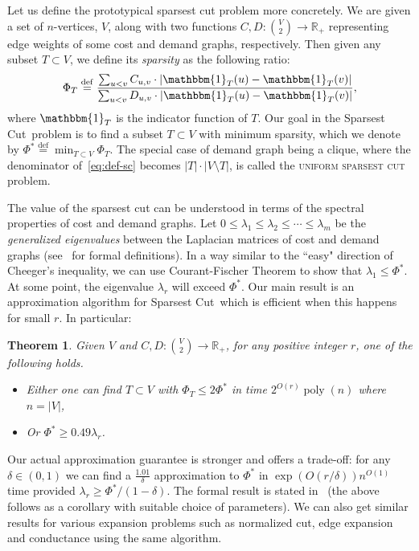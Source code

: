 \documentclass{article}
\def\triangleq{\overset{\mathrm{def}}{=}}
\newtheorem{theorem}{Theorem}[section]
\DeclareMathOperator{\poly}{poly}
\newcommand{\R}{\mathbb{R}}
\newcommand{\ind}[1]{\mathbbm{1}_{#1}}
\newcommand{\nusc}{\textsc{\sf Non-Uniform Sparsest Cut}}
\newcounter{alg-count}
\def\ngap{}
\renewcommand{\nusc}{{\sc Sparsest Cut}}
\newcommand{\vnote}[1]{}
\newcommand{\aknote}[1]{}
\begin{document}
Let us define the prototypical sparsest cut problem more
concretely. We are given a set of $n$-vertices, $V$, along with two
functions $C, D: \binom{V}{2}\to \R_+$ representing edge weights of
some cost and demand graphs, respectively.  Then given any subset $T
\subset V$, we define its {\em sparsity} as the following ratio:
\begin{equation}
\label{eq:def-sc}
\Phi_T \triangleq \frac{\sum_{u<v} C_{u,v} \cdot 
| \ind{T}(u) - \ind{T}(v) |}{ \sum_{u<v} D_{u,v} \cdot 
| \ind{T}(u) - \ind{T}(v) |},
\end{equation}
where $\ind{T}$ is the indicator function of $T$.  Our goal in the
\nusc\ problem is to find a subset $T\subset V$ with minimum sparsity,
which we denote by $\Phi^\ast \triangleq \min_{T\subset V} \Phi_T$.
The special case of demand graph being a clique, where the denominator
of~\cref{eq:def-sc} becomes $|T| \cdot |V\setminus T|$, is called the
\textsc{uniform sparsest cut} problem.

The value of the sparsest cut can be understood in terms of the
spectral properties of cost and demand graphs.  Let $0 \le \lambda_1
\le \lambda_2 \le \cdots \le \lambda_m$ be the {\em generalized
  eigenvalues} between the Laplacian matrices of cost and demand
graphs (see~ for formal definitions).  In a way
similar to the ``easy" direction of Cheeger's inequality, we can use
Courant-Fischer Theorem to show that $\lambda_1 \le
\Phi^\ast$. \vnote{Should it be $\lambda_2 \le \Phi^\ast$, or is it
  $\lambda_1$ for generalized eigenvalues. Would be good to mention it
  explicitly if latter.} \aknote{Should be $\lambda_1$, good catch!
  See footnote.}
At some point, the eigenvalue $\lambda_r$ will exceed
$\Phi^\ast$. Our main result is an approximation algorithm for \nusc\ which is
efficient when this happens for small $r$. In particular:
\begin{theorem}\label{thm:intro-main-1}
Given $V$ and $C,D:\binom{V}{2}\to \R_+$, for any positive integer $r$,
one of the following holds. \begin{itemize}
\itemsep=0ex
\item Either one can find $T \subset V$ with $\Phi_T \le 2 \Phi^\ast$
  in time $2^{O\left(r\right)} \poly(n)$ where $n=|V|$,
\item Or $\Phi^\ast \ge 0.49 \lambda_r$.
\end{itemize}
\end{theorem}
Our actual approximation guarantee is stronger and offers a trade-off:
for any $\delta \in (0,1)$ we can find a $\frac{1.01}{\delta}$
approximation to $\Phi^\ast$ in $\exp(O(r/\delta)) n^{O(1)}$ time
provided $\lambda_r \ge \Phi^\ast/(1-\delta)$. The formal result is
stated in~ (the above follows as a corollary with
suitable choice of parameters).
We can also get similar results for various expansion problems such as
normalized cut, edge expansion and conductance using the same
algorithm.
\ngap
\end{document}
